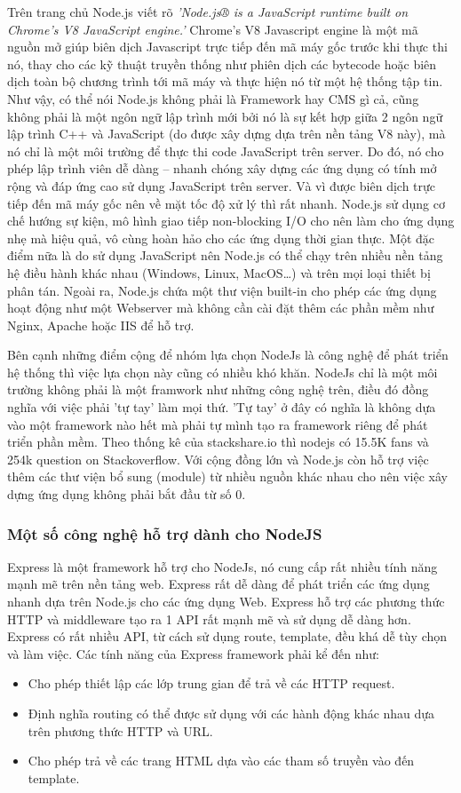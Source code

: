 Trên trang chủ Node.js viết rõ \textit{'Node.js® is a JavaScript runtime built on Chrome's V8 JavaScript engine.'} Chrome’s V8 Javascript engine là một mã nguồn mở giúp biên dịch Javascript trực tiếp đến mã máy gốc trước khi thực thi nó, thay cho các kỹ thuật truyền thống như phiên dịch các bytecode hoặc biên dịch toàn bộ chương trình tới mã máy và thực hiện nó từ một hệ thống tập tin. Như vậy, có thể nói Node.js không phải là Framework hay CMS gì cả, cũng không phải là một ngôn ngữ lập trình mới bởi nó là sự kết hợp giữa 2 ngôn ngữ lập trình C++ và JavaScript (do được xây dựng dựa trên nền tảng  V8 này), mà nó chỉ là một môi trường để thực thi code JavaScript trên server. Do đó, nó cho phép lập trình viên dễ dàng – nhanh chóng xây dựng các ứng dụng có tính mở rộng và đáp ứng cao sử dụng JavaScript trên server. Và vì được biên dịch trực tiếp đến mã máy gốc nên về mặt tốc độ xử lý thì rất nhanh. Node.js sử dụng cơ chế hướng sự kiện, mô hình giao tiếp  non-blocking I/O cho nên làm cho ứng dụng nhẹ mà hiệu quả, vô cùng hoàn hảo cho các ứng dụng thời gian thực. Một đặc điểm nữa là do sử dụng JavaScript nên Node.js có thể chạy trên nhiều nền tảng hệ điều hành khác nhau (Windows, Linux, MacOS…) và trên mọi loại thiết bị phân tán. Ngoài ra, Node.js chứa một thư viện built-in cho phép các ứng dụng hoạt động như một Webserver mà không cần cài đặt thêm các phần mềm như Nginx, Apache hoặc IIS để hỗ trợ.

Bên cạnh những điểm cộng để nhóm lựa chọn NodeJs là công nghệ để phát triển hệ thống thì việc lựa chọn này cũng có nhiều khó khăn. NodeJs chỉ là một môi trường không phải là một framwork như những công nghệ trên, điều đó đồng nghĩa với việc phải 'tự tay' làm mọi thứ. 'Tự tay' ở đây có nghĩa là không dựa vào một framework nào hết mà phải tự mình tạo ra framework riêng để phát triển phần mềm. Theo thống kê của stackshare.io thì nodejs có 15.5K fans và 254k question on Stackoverflow. Với cộng đồng lớn và Node.js còn hỗ trợ việc thêm các thư viện bổ sung (module) từ nhiều nguồn khác nhau cho nên việc xây dựng ứng dụng không phải bắt đầu từ số 0.
\subsubsection{Một số công nghệ hỗ trợ dành cho NodeJS}

Express là một framework hỗ trợ cho NodeJs, nó cung cấp rất nhiều tính năng mạnh mẽ trên nền tảng web. Express rất dễ dàng để phát triển các ứng dụng nhanh dựa trên Node.js cho các ứng dụng Web. Express hỗ trợ các phương thức HTTP và middleware tạo ra 1 API rất mạnh mẽ và sử dụng dễ dàng hơn. Express có rất nhiều API, từ cách sử dụng route, template, đều khá dễ tùy chọn và làm việc. Các tính năng của Express framework phải kể đến như:
\begin{itemize}
    \item Cho phép thiết lập các lớp trung gian để trả về các HTTP request.
    \item Định nghĩa routing có thể được sử dụng với các hành động khác nhau dựa trên phương thức HTTP và URL.
    \item Cho phép trả về các trang HTML dựa vào các tham số truyền vào đến template.
\end{itemize}

